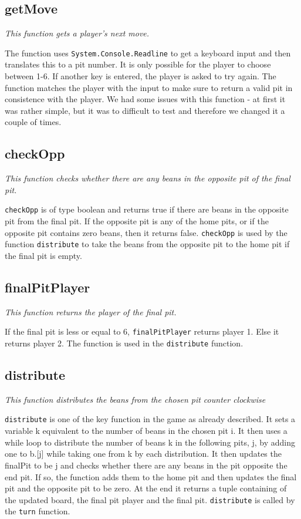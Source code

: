 \documentclass[a4paper]{report}
\begin{document}
\subsection*{getMove}
{\it This function gets a player's next move.}

The function uses \texttt{System.Console.Readline} to get a keyboard input and then translates this to a pit number. It is only possible for the player to choose between 1-6. If another key is entered, the player is asked to try again. The function matches the player with the input to make sure to return a valid pit in consistence with the player. We had some issues with this function - at first it was rather simple, but it was to difficult to test and therefore we changed it a couple of times.

\subsection*{checkOpp}
{\it This function checks whether there are any beans in the opposite pit of the final pit.}

\texttt{checkOpp} is of type boolean and returns true if there are beans in the opposite pit from the final pit. If the opposite pit is any of the home pits, or if the opposite pit contains zero beans, then it returns false. \texttt{checkOpp} is used by the function \texttt{distribute} to take the beans from the opposite pit to the home pit if the final pit is empty.

\subsection*{finalPitPlayer}
{\it This function returns the player of the final pit.}

If the final pit is less or equal to 6, \texttt{finalPitPlayer} returns player 1. Else it returns player 2. The function is used in the \texttt{distribute} function.

\subsection*{distribute}
{\it This function distributes the beans from the chosen pit counter clockwise}

\texttt{distribute} is one of the key function in the game as already described. It sets a variable k equivalent to the number of beans in the chosen pit i. It then uses a while loop to distribute the number of beans k in the following pits, j, by adding one to b.[j] while taking one from k by each distribution. It then updates the finalPit to be j and checks whether there are any beans in the pit opposite the end pit. If so, the function adds them to the home pit and then updates the final pit and the opposite pit to be zero. At the end it returns a tuple containing of the updated board, the final pit player and the final pit. \texttt{distribute} is called by the \texttt{turn} function.
\end{document}
